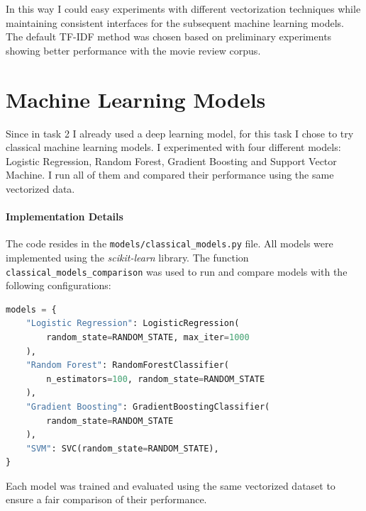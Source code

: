 \documentclass[12pt]{article}
\begin{document}
In this way I could easy experiments with different vectorization techniques while maintaining consistent interfaces for the subsequent machine learning models. The default TF-IDF method was chosen based on preliminary experiments showing better performance with the movie review corpus.





\section{Machine Learning Models}
Since in task 2 I already used a deep learning model, for this task I chose to try classical machine learning models. I experimented with four different models: Logistic Regression, Random Forest, Gradient Boosting and Support Vector Machine. I run all of them and compared their performance using the same vectorized data.

\paragraph{Implementation Details}
The code resides in the \texttt{models/classical\_models.py} file. All models were implemented using the \textit{scikit-learn} library. The function \texttt{classical\_models\_comparison} was used to run and compare models with the following configurations:

\begin{lstlisting}[language=Python]
models = {
    "Logistic Regression": LogisticRegression(
        random_state=RANDOM_STATE, max_iter=1000
    ),
    "Random Forest": RandomForestClassifier(
        n_estimators=100, random_state=RANDOM_STATE
    ),
    "Gradient Boosting": GradientBoostingClassifier(
        random_state=RANDOM_STATE
    ),
    "SVM": SVC(random_state=RANDOM_STATE),
}
\end{lstlisting}

Each model was trained and evaluated using the same vectorized dataset to ensure a fair comparison of their performance.



\end{document}
